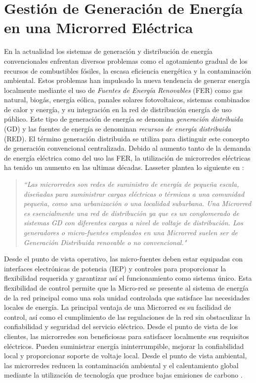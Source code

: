 \section{Gestión de Generación de Energía en una Microrred Eléctrica}
En la actualidad los sistemas de generación y distribución de energía convencionales enfrentan diversos problemas como el agotamiento gradual de los recursos de combustibles fósiles, la escasa eficiencia energética y la contaminación ambiental. Estos problemas han impulsado la nueva tendencia de generar energía localmente mediante el uso de \textit{Fuentes de Energía Renovables} (FER) como gas natural, biogás, energía eólica, panales solares fotovoltaicos, sistemas combinados de calor y energía, y su integración en la red de distribución energía de uso público. Este tipo de generación de energía se denomina \textit{generación distribuida} (GD) y las fuentes de energía se denominan\textit{ recursos de energía distribuida }(RED). El término generación distribuida se utiliza para distinguir este concepto de generación convencional centralizada. Debido al aumento tanto de la demanda de energía eléctrica como del uso las FER, la utilización de microrredes eléctricas ha tenido un aumento en las ultimas décadas. Lasseter plantea lo siguiente en  \cite{lasseter2002microgrids}:
\begin{quote}
\textit{``Las microrredes son redes de suministro de energía de pequeña escala, diseñadas para suministrar cargas eléctricas o térmicas a una comunidad pequeña, como una urbanización o una localidad suburbana. Una Microrred es esencialmente una red de distribución ya que es un conglomerado de sistemas GD con diferentes cargas a nivel de voltaje de distribución. Los generadores o micro-fuentes empleados en una Microrred suelen ser de Generación Distribuida renovable o no convencional."}
\end{quote}


Desde el punto de vista operativo, las micro-fuentes deben estar equipadas con interfaces electrónicas de potencia (IEP) y controles para proporcionar la flexibilidad requerida y  garantizar así el funcionamiento como sistema único. Esta flexibilidad de control permite que la Micro-red se presente al sistema de energía de la red principal como una sola unidad controlada que satisface las necesidades locales de energía. La principal ventaja de una Microrred es su facilidad de control, así como el cumplimiento de las regulaciones de la red sin obstaculizar la confiabilidad y seguridad del servicio eléctrico. Desde el punto de vista de los clientes, las microrredes son beneficiosas para satisfacer localmente sus requisitos eléctricos. Pueden suministrar energía ininterrumpible, mejorar la confiabilidad local y proporcionar soporte de voltaje local. Desde el punto de vista ambiental, las microrredes reducen la contaminación ambiental y el calentamiento global mediante la utilización de tecnología que produce bajas emisiones de carbono  \cite{lasseter2002microgrids}. 

